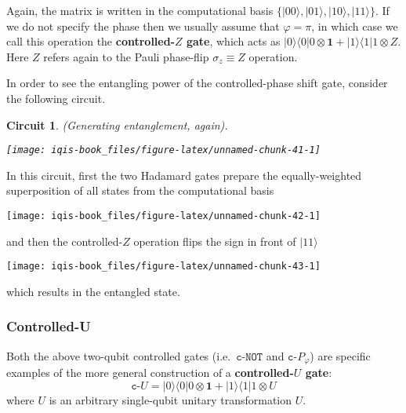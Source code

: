 \documentclass[fleqn]{article}
\newtheorem*{circuit}{Circuit}
\begin{document}
Again, the matrix is written in the computational basis \(\{|00\rangle,|01\rangle,|10\rangle,|11\rangle\}\).
If we do not specify the phase then we usually assume that \(\varphi=\pi\), in which case we call this operation the \textbf{controlled-\(Z\) gate}, which acts as \(|0\rangle\langle 0|0\otimes\mathbf{1}+ |1\rangle\langle 1|1\otimes Z\).
Here \(Z\) refers again to the Pauli phase-flip \(\sigma_z\equiv Z\) operation.

In order to see the entangling power of the controlled-phase shift gate, consider the following circuit.

\begin{circuit}

(Generating entanglement, again).

\begin{center}\texttt{[image: iqis-book\_files/figure-latex/unnamed-chunk-41-1]} \end{center}


\end{circuit}

In this circuit, first the two Hadamard gates prepare the equally-weighted superposition of all states from the computational basis

\begin{center}\texttt{[image: iqis-book\_files/figure-latex/unnamed-chunk-42-1]} \end{center}

and then the controlled-\(Z\) operation flips the sign in front of \(|11\rangle\)

\begin{center}\texttt{[image: iqis-book\_files/figure-latex/unnamed-chunk-43-1]} \end{center}

which results in the entangled state.

\hypertarget{controlled-u}{%
\subsubsection{Controlled-U}\label{controlled-u}}

Both the above two-qubit controlled gates (i.e.~\(\texttt{c-NOT}\) and \(\texttt{c-}P_\varphi\)) are specific examples of the more general construction of a \textbf{controlled-\(U\) gate}:
\[
  \texttt{c-}U
  =
  |0\rangle\langle 0|0\otimes\mathbf{1}+ |1\rangle\langle 1|1\otimes U
\]
where \(U\) is an arbitrary single-qubit unitary transformation \(U\).
\end{document}
